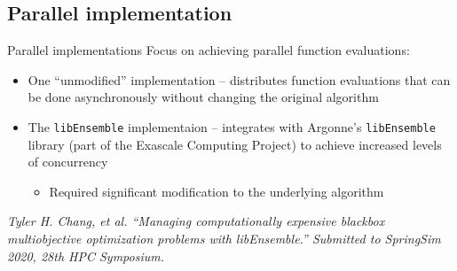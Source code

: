 \documentclass[xcolor=dvipsnames]{beamer}
\begin{document}
\subsection{Parallel implementation}
\begin{frame}{Parallel implementations}
Focus on achieving parallel function evaluations:
\begin{itemize}
\item One ``unmodified'' implementation -- distributes function evaluations
that can be done asynchronously without changing the original algorithm
\item The {\tt libEnsemble} implementaion -- integrates with Argonne's
{\tt libEnsemble} library (part of the Exascale Computing Project) to
achieve increased levels of concurrency
\begin{itemize}
\item Required significant modification to the
underlying algorithm
\end{itemize}
\end{itemize}
{\it \small
Tyler H. Chang, et al.
``Managing computationally expensive blackbox multiobjective optimization
problems with libEnsemble.''
Submitted to SpringSim 2020, 28th HPC Symposium.
}
\end{frame}
\end{document}

